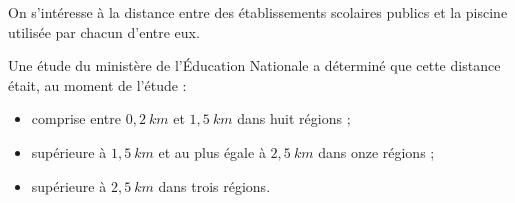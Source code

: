 \documentclass[10pt,openright,twoside,french]{book}
\begin{document}

On s'intéresse à la distance entre des établissements scolaires publics et la piscine utilisée par chacun d'entre eux.\par
Une étude du ministère de l'\'Education Nationale a déterminé que cette distance était, au moment de l'étude :
\begin{itemize}
    \item comprise entre $0{,}2~km$ et $1{,}5~km$ dans huit régions ;
    \item supérieure à $1{,}5~km$ et au plus égale à $2{,}5~km$ dans onze régions ;
    \item supérieure à $2{,}5~km$ dans trois régions.
\end{itemize}\medskip
\end{document}
